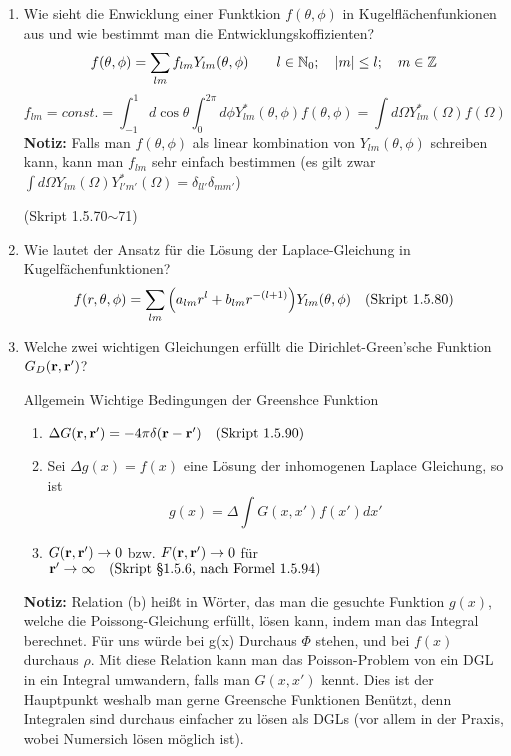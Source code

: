 \documentclass{scrartcl}
\newcommand{\ds}{\displaystyle}
\newcommand{\smref}[1]{\quad\text{(Skript #1)}}
\begin{document}
\begin{enumerate}
    \item Wie sieht die Enwicklung einer Funktkion $f(\theta,\phi)$ in
          Kugelflächenfunkionen aus und wie bestimmt man die 
          Entwicklungskoffizienten?
          $$\ds f(\theta, \phi)=\sum_{lm} f_{lm}Y_{lm}(\theta,\phi)
          \qquad l\in \mathbb{N}_0;\quad \abs{m}\le l; 
          \quad m\in\mathbb{Z}$$
          $$\ds f_{lm}=const.
           =\int_{-1}^{1} d\cos\theta\int_0^{2\pi}d\phi 
           Y^*_{lm}(\theta,\phi)f(\theta,\phi)
           =\int d\Omega Y^*_{lm}(\Omega)f(\Omega)$$
           \textbf{Notiz:} Falls man $f(\theta,\phi)$ als linear kombination
           von $Y_{lm}(\theta,\phi)$ schreiben kann, kann man $f_{lm}$
           sehr einfach bestimmen (es gilt zwar $\ds \int d\Omega 
           Y_{lm}(\Omega)Y_{l'm'}^*(\Omega)=\delta_{ll'}\delta_{mm'}$)
          \begin{center}
            (Skript 1.5.70$\sim$71)
          \end{center}

    \item Wie lautet der Ansatz für die Lösung der Laplace-Gleichung in
          Kugelfächenfunktionen?\\
          $$f(r,\theta,\phi)=
          \sum_{lm}\qty(a_{lm}r^l+b_{lm}r^{-(l+1)})Y_{lm}(\theta,\phi)
          \quad\text{(Skript 1.5.80)}$$
           
    \item Welche zwei wichtigen Gleichungen erfüllt die Dirichlet-Green'sche
          Funktion $G_D(\vb r, \vb r')$?

          Allgemein Wichtige Bedingungen der Greenshce Funktion
          \begin{center}
            \begin{enumerate}
              \item $\Delta G(\vb r, \vb r') = -4\pi\delta(\vb r -\vb r')
                \smref{1.5.90}$
              \item Sei $\Delta g(x) = f(x)$ eine Lösung der inhomogenen  
                Laplace Gleichung, so ist 
                $$ g(x)=\Delta\int G(x,x')f(x')dx'$$
              \item $G(\vb r, \vb r') \to 0$ bzw. $F(\vb r, \vb r')\to 0$ 
                für $\vb r'\to\infty
                \smref{§1.5.6, nach Formel 1.5.94}$
            \end{enumerate}
          \end{center}
          \textbf{Notiz:} Relation (b) heißt in Wörter, das man die gesuchte
          Funktion $g(x)$, welche die Poissong-Gleichung erfüllt, lösen
          kann, indem man das Integral berechnet. Für uns würde bei g(x)
          Durchaus $\Phi$ stehen, und bei $f(x)$ durchaus $\rho$.
          Mit diese Relation kann man das 
          Poisson-Problem
          von ein DGL in ein Integral umwandern, falls man $G(x,x')$ kennt.
          Dies ist der Hauptpunkt weshalb man gerne Greensche Funktionen
          Benützt, denn Integralen sind durchaus einfacher 
          zu lösen als DGLs (vor allem in der Praxis, wobei Numersich
          lösen möglich ist).


\end{enumerate}
\end{document}
